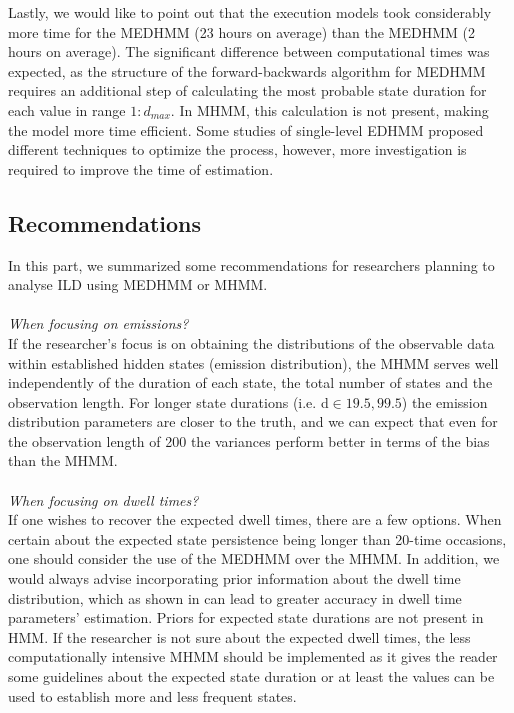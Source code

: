Lastly, we would like to point out that the execution models took considerably more time for the MEDHMM (23 hours on average) than the MEDHMM (2 hours on average). The significant difference between computational times was expected, as the structure of the forward-backwards algorithm for MEDHMM requires an additional step of calculating the most probable state duration for each value in range $1:d_{max}$. In MHMM, this calculation is not present, making the model more time efficient. Some studies of single-level EDHMM proposed different techniques to optimize the process, however, more investigation is required to improve the time of estimation. 

 

\subsection{Recommendations}
In this part, we summarized some recommendations for researchers planning to analyse ILD using MEDHMM or MHMM. \\\\
\emph{When focusing on emissions?}\\
If the researcher's focus is on obtaining the distributions of the observable data within established hidden states (emission distribution), the MHMM serves well independently of the duration of each state, the total number of states and the observation length. For longer state durations (i.e. d$\in{19.5, 99.5}$) the emission distribution parameters are closer to the truth, and we can expect that even for the observation length of 200 the variances perform better in terms of the bias than the MHMM.  \\ \\
\emph{When focusing on dwell times?}\\
If one wishes to recover the expected dwell times, there are a few options. When certain about the expected state persistence being longer than 20-time occasions, one should consider the use of the MEDHMM over the MHMM. In addition, we would always advise incorporating prior information about the dwell time distribution, which as shown in \cite{hadjamar2022bayesian} can lead to greater accuracy in dwell time parameters' estimation. Priors for expected state durations are not present in HMM. If the researcher is not sure about the expected dwell times, the less computationally intensive MHMM should be implemented as it gives the reader some guidelines about the expected state duration or at least the values can be used to establish more and less frequent states. \\ \\
